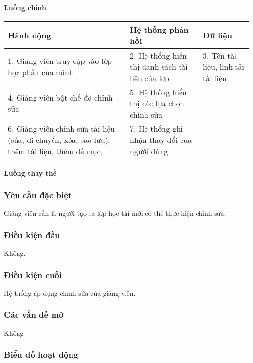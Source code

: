 \documentclass[./../main_file.tex]{subfiles}
\begin{document}
\paragraph{Luồng chính}
\begin{table}[H]
				\begin{tabular}{|p{.33\textwidth}|p{}|p{}|}
		\hline
		\textbf{Hành động}              & \textbf{Hệ thống phản hồi}               & \textbf{Dữ liệu} \\ \hline
		1. Giảng viên truy cập vào lớp học phần của mình                                             & 2. Hệ thống hiển thị danh sách tài liệu của lớp & 3. Tên tài liệu, link tải tài liệu \\ \hline
		4. Giảng viên bật chế độ chỉnh sửa & 5. Hệ thống hiển thị các lựa chọn chỉnh sửa &                  \\ \hline
		6. Giảng viên chỉnh sửa tài liệu (sửa, di chuyển, xóa, sao lưu), thêm tài liệu, thêm đề mục. & 7. Hệ thống ghi nhận thay đổi của người dùng    &                                 \\ \hline
	\end{tabular}
\end{table}
\paragraph{Luồng thay thế}
\subsubsection{Yêu cầu đặc biệt}
Giảng viên cần là người tạo ra lớp học thì mới có thể thực hiện chỉnh sửa.

\subsubsection{Điều kiện đầu}
Không.

\subsubsection{Điều kiện cuối}
Hệ thống áp dụng chỉnh sửa của giảng viên.

\subsubsection{Các vấn đề mở}
Không

\subsubsection{Biểu đồ hoạt động}
\end{document}

